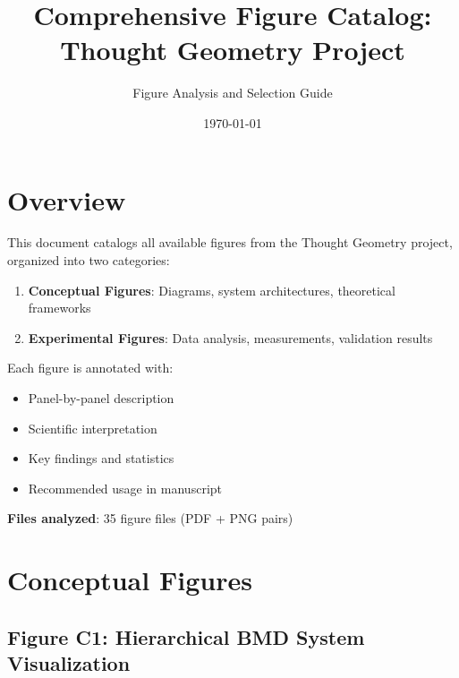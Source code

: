 \documentclass[11pt]{article}
\title{Comprehensive Figure Catalog: Thought Geometry Project}
\author{Figure Analysis and Selection Guide}
\date{\today}
\begin{document}
\maketitle

\tableofcontents
\newpage

\section{Overview}

This document catalogs all available figures from the Thought Geometry project, organized into two categories:
\begin{enumerate}
\item \textbf{Conceptual Figures}: Diagrams, system architectures, theoretical frameworks
\item \textbf{Experimental Figures}: Data analysis, measurements, validation results
\end{enumerate}

Each figure is annotated with:
\begin{itemize}
\item Panel-by-panel description
\item Scientific interpretation
\item Key findings and statistics
\item Recommended usage in manuscript
\end{itemize}

\textbf{Files analyzed}: 35 figure files (PDF + PNG pairs)

\newpage

\section{Conceptual Figures}

\subsection{Figure C1: Hierarchical BMD System Visualization}

\end{document}
